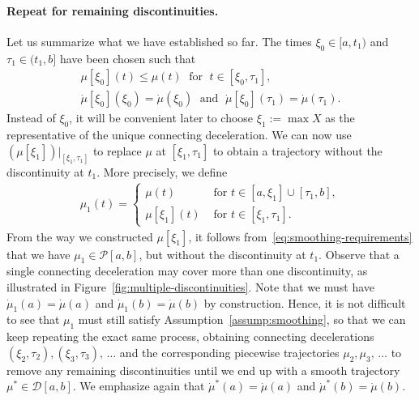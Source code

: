 \documentclass[a4paper]{report}
\theoremstyle{definition}
\theoremstyle{plain}
\newcommand\halfopen[2]{\ensuremath{[#1,#2)}}
\newcommand\openhalf[2]{\ensuremath{(#1,#2]}}
\begin{document}
\paragraph{Repeat for remaining discontinuities.}
Let us summarize what we have established so far.
%
The times $\xi_{0} \in \halfopen{a}{t_{1}}$ and
$\tau_{1} \in \openhalf{t_{1}}{b}$ have been chosen such that
\begin{subequations}\label{eq:smoothing-requirements}
\begin{gather}
  \mu[\xi_{0}](t) \leq \mu(t) \; \text{ for } \; t \in [\xi_{0}, \tau_{1}] , \\
  \dot{\mu}[\xi_{0}](\xi_{0}) = \dot{\mu}(\xi_{0}) \; \text{ and } \; \dot{\mu}[\xi_{0}](\tau_{1}) = \dot{\mu}(\tau_{1}) .
\end{gather}
\end{subequations}
Instead of $\xi_{0}$, it will be convenient later to choose $\xi_{1} := \max X$
as the representative of the unique connecting deceleration.
%
We can now use $(\mu[\xi_{1}])|_{[\xi_{1},\tau_{1}]}$ to replace $\mu$ at $[\xi_{1}, \tau_{1}]$ to
obtain a trajectory without the discontinuity at $t_{1}$. More precisely, we
define
\begin{align}
  \mu_{1}(t) =
  \begin{cases}
    \mu(t) &\text{ for } t \in [a, \xi_{1}] \cup [\tau_{1}, b] , \\
    \mu[\xi_{1}](t) &\text{ for } t \in [\xi_{1}, \tau_{1}] .
  \end{cases}
\end{align}
From the way we constructed $\mu[\xi_{1}]$, it follows
from~\eqref{eq:smoothing-requirements} that we have
$\mu_{1} \in \mathcal{P}[a,b]$, but without the discontinuity at $t_{1}$.
%
Observe that a single connecting deceleration may cover more than one
discontinuity, as illustrated in Figure~\ref{fig:multiple-discontinuities}.
%
Note that we must have $\dot{\mu}_{1}(a) = \dot{\mu}(a)$ and
$\dot{\mu}_{1}(b) = \dot{\mu}(b)$ by construction.
%
Hence, it is not difficult to see that $\mu_{1}$ must still satisfy
Assumption~\ref{assump:smoothing}, so that we can keep repeating the exact same
process, obtaining connecting decelerations $(\xi_{2}, \tau_2), (\xi_{3}, \tau_{3}), \,\dots$
and the corresponding piecewise trajectories $\mu_{2}, \mu_{3}, \,\dots$ to remove any
remaining discontinuities until we end up with a smooth trajectory
$\mu^{*} \in \mathcal{D}[a,b]$.
%
We emphasize again that $\dot{\mu}^{*}(a) = \dot{\mu}(a)$ and
$\dot{\mu}^{*}(b) = \dot{\mu}(b)$.
\end{document}
